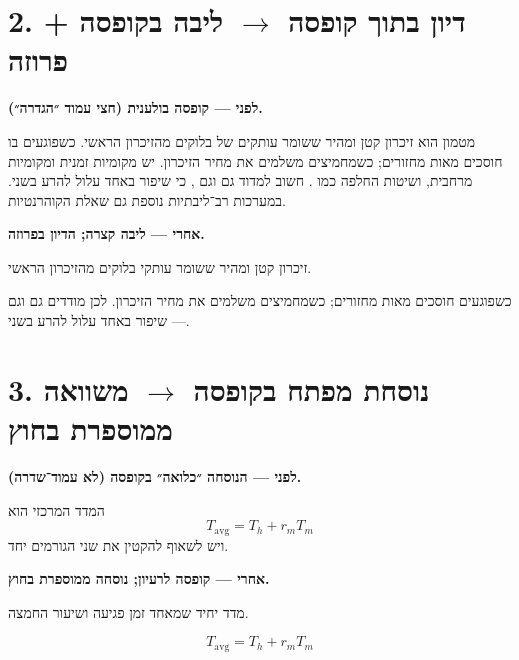 \clearpage
\section*{2. דיון בתוך קופסה $\rightarrow$ ליבה בקופסה + פרוזה}

\noindent\textbf{לפני — קופסה בולענית (חצי עמוד ״הגדרה״).}

\begin{defbox}[nobreak=true,frametitle={הגדרה — מטמון}]
מטמון הוא זיכרון קטן ומהיר ששומר עותקים של בלוקים מהזיכרון הראשי.
כשפוגעים בו חוסכים מאות מחזורים; כשמחמיצים משלמים את מחיר הזיכרון.
יש מקומיות זמנית ומקומיות מרחבית, ושיטות החלפה כמו .
חשוב למדוד גם  וגם , כי שיפור באחד עלול להרע בשני.
במערכות רב־ליבתיות נוספת גם שאלת הקוהרנטיות.
\end{defbox}

\noindent\textbf{אחרי — ליבה קצרה; הדיון בפרוזה.}
\begin{defbox}[frametitle={הגדרה — מטמון}]
זיכרון קטן ומהיר ששומר עותקי בלוקים מהזיכרון הראשי.
\end{defbox}

כשפוגעים חוסכים מאות מחזורים; כשמחמיצים משלמים את מחיר הזיכרון.
לכן מודדים גם  וגם  — שיפור באחד עלול להרע בשני.

\clearpage
\section*{3. נוסחת מפתח בקופסה $\rightarrow$ משוואה ממוספרת בחוץ}

\noindent\textbf{לפני — הנוסחה ״כלואה״ בקופסה (לא עמוד־שדרה).}

\begin{keybox}[nobreak=true,frametitle={רעיון מפתח}]
המדד המרכזי הוא
\[ T_{\mathrm{avg}}=T_h+r_m T_m \]
ויש לשאוף להקטין את שני הגורמים יחד.
\end{keybox}

\noindent\textbf{אחרי — קופסה לרעיון; נוסחה ממוספרת בחוץ.}
\begin{keybox}[frametitle={רעיון מפתח — \en{AMAT}}]
מדד יחיד שמאחד זמן פגיעה ושיעור החמצה.
\end{keybox}

\begin{equation}
\label{eq:ba-amat}
T_{\mathrm{avg}}=T_h+r_m T_m
\end{equation}

